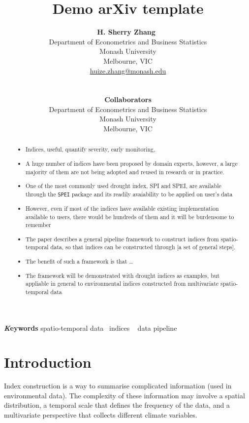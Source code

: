 \documentclass[
]{article}
\title{Demo arXiv template}
\author{
\textbf{H. Sherry Zhang}~\orcidlink{0000-0002-7122-1463}\\Department of
Econometrics and Business Statistics\\Monash University\\Melbourne,
VIC\\\href{mailto:huize.zhang@monash.edu}{huize.zhang@monash.edu}\\\\\\
\textbf{Collaborators}\\Department of Econometrics and Business
Statistics\\Monash University\\Melbourne, VIC\\}
\date{}
\providecommand{\tightlist}{%
  \setlength{\itemsep}{0pt}\setlength{\parskip}{0pt}}\usepackage{longtable,booktabs,array}
\begin{document}
\maketitle
\begin{abstract}
\begin{itemize}
\tightlist
\item
  Indices, useful, quantify severity, early monitoring,
\item
  A huge number of indices have been proposed by domain experts,
  however, a large majority of them are not being adopted and reused in
  research or in practice.
\item
  One of the most commonly used drought index, SPI and SPEI, are
  available through the \texttt{SPEI} package and its readily
  avaiability to be applied on user's data
\item
  However, even if most of the indices have available existing
  implementation available to users, there would be hundreds of them and
  it will be burdensome to remember
\item
  The paper describes a general pipeline framework to construct indices
  from spatio-temporal data, so that indices can be constructed through
  {[}a set of general steps{]}.
\item
  The benefit of such a framework is that \ldots{}
\item
  The framework will be demonstrated with drought indices as examples,
  but appliable in general to environmental indices constructed from
  multivariate spatio-temporal data
\end{itemize}
\end{abstract}
{\bfseries \emph Keywords}
\def\sep{\textbullet\ }
spatio-temporal data \sep indices \sep 
data pipeline

\ifdefined\Shaded\renewenvironment{Shaded}{\begin{tcolorbox}[breakable, boxrule=0pt, borderline west={3pt}{0pt}{shadecolor}, enhanced, sharp corners, frame hidden, interior hidden]}{\end{tcolorbox}}\fi

\hypertarget{introduction}{%
\section{Introduction}\label{introduction}}

Index construction is a way to summarise complicated information (used
in environmental data). The complexity of these information may involve
a spatial distribution, a temporal scale that defines the frequency of
the data, and a multivariate perspective that collects different climate
variables.
\end{document}
